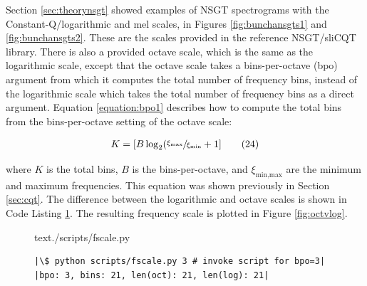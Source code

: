 \documentclass[report.tex]{subfiles}
\begin{document}
Section \ref{sec:theorynsgt} showed examples of NSGT spectrograms with the Constant-Q/logarithmic and mel scales, in Figures \ref{fig:bunchansgts1} and \ref{fig:bunchansgts2}. These are the scales provided in the reference NSGT/sliCQT library. There is also a provided octave scale, which is the same as the logarithmic scale, except that the octave scale takes a bins-per-octave (bpo) argument from which it computes the total number of frequency bins, instead of the logarithmic scale which takes the total number of frequency bins as a direct argument. Equation \eqref{equation:bpo1} describes how to compute the total bins from the bins-per-octave setting of the octave scale:

\begin{align}
	K = [B \log_{2}(\sfrac{\xi_{\text{max}}}{\xi_{\text{min}}} + 1]\tag{24}\label{equation:bpo1}
\end{align}

where $K$ is the total bins, $B$ is the bins-per-octave, and $\xi_{\text{min,max}}$ are the minimum and maximum frequencies. This equation was shown previously in Section \ref{sec:cqt}. The difference between the logarithmic and octave scales is shown in Code Listing \ref{code:octvlog}. The resulting frequency scale is plotted in Figure \ref{fig:octvlog}.

\begin{figure}[h]
  \centering
 \begin{minipage}{\textwidth}
  \centering
\setlength\partopsep{-\topsep}
\begin{inputminted}[linenos,breaklines,frame=single,firstline=4,lastline=16,fontsize=\scriptsize]{text}{./scripts/fscale.py}
\end{inputminted}
 \vspace{1em}
 \end{minipage}
 \begin{minipage}{\textwidth}
  \centering
\begin{verbatim}
|\$ python scripts/fscale.py 3 # invoke script for bpo=3|
|bpo: 3, bins: 21, len(oct): 21, len(log): 21|
\end{verbatim}
 \end{minipage}
  \label{code:octvlog}
\end{figure}
\end{document}
